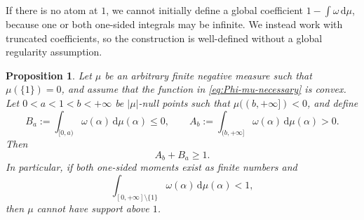 \documentclass[aps,pra,11pt,onecolumn,nofootinbib,tightenlines]{revtex4-2}
\newtheorem{proposition}[theorem]{Proposition}
\theoremstyle{definition}
\begin{document}
If there is no atom at $1$, we cannot initially define a global coefficient
$1-\int\omega\,\mathrm d\mu$, because one or both one-sided integrals may be infinite. We instead work with truncated coefficients, so the construction is well-defined without a global regularity assumption.

\begin{proposition}
\label{prop:negative-truncated-moment}
Let $\mu$ be an arbitrary finite negative measure such that $\mu(\{1\})=0$, and assume that the function in \eqref{eq:Phi-mu-necessary} is convex. Let $0<a<1<b<+\infty$ be $|\mu|$-null points such that $\mu((b,+\infty])<0$, and define
\begin{equation}
 B_a:=\int_{[0,a)}\omega(\alpha)\,\mathrm d\mu(\alpha)\leq0,
 \qquad
 A_b:=\int_{(b,+\infty]}\omega(\alpha)\,\mathrm d\mu(\alpha)>0.
 \label{eq:negative-truncated-coefficients}
\end{equation}
Then
\begin{equation}
 A_b+B_a\geq1.
 \label{eq:negative-truncated-inequality}
\end{equation}
In particular, if both one-sided moments exist as finite numbers and
\begin{equation}
 \int_{[0,+\infty]\setminus\{1\}}
 \omega(\alpha)\,\mathrm d\mu(\alpha)<1,
 \label{eq:negative-global-less-than-one}
\end{equation}
then $\mu$ cannot have support above $1$.
\end{proposition}
\end{document}
